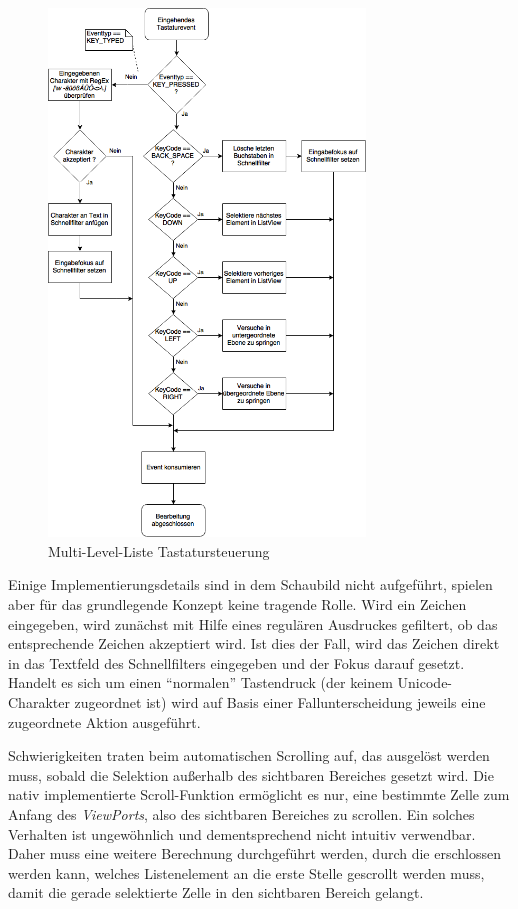 \begin{figure}[H]
 \centering
 \includegraphics[width=0.75\textwidth]{grafiken/MLL_KeyCapture.png}
 \caption{Multi-Level-Liste Tastatursteuerung}
 \label{fig:mllKeyCapture}
\end{figure}
Einige Implementierungsdetails sind in dem Schaubild nicht aufgeführt, spielen aber für das grundlegende Konzept keine tragende Rolle. Wird ein Zeichen eingegeben, wird zunächst mit Hilfe eines regulären Ausdruckes gefiltert, ob das entsprechende Zeichen akzeptiert wird. Ist dies der Fall, wird das Zeichen direkt in das Textfeld des Schnellfilters eingegeben und der Fokus darauf gesetzt. Handelt es sich um einen \enquote{normalen} Tastendruck (der keinem Unicode-Charakter zugeordnet ist) wird auf Basis einer Fallunterscheidung jeweils eine zugeordnete Aktion ausgeführt.\par
Schwierigkeiten traten beim automatischen Scrolling auf, das ausgelöst werden muss, sobald die Selektion außerhalb des sichtbaren Bereiches gesetzt wird. Die nativ implementierte Scroll-Funktion ermöglicht es nur, eine bestimmte Zelle zum Anfang des \textit{ViewPorts}, also des sichtbaren Bereiches zu scrollen. Ein solches Verhalten ist ungewöhnlich und dementsprechend nicht intuitiv verwendbar. Daher muss eine weitere Berechnung durchgeführt werden, durch die erschlossen werden kann, welches Listenelement an die erste Stelle gescrollt werden muss, damit die gerade selektierte Zelle in den sichtbaren Bereich gelangt.\par
